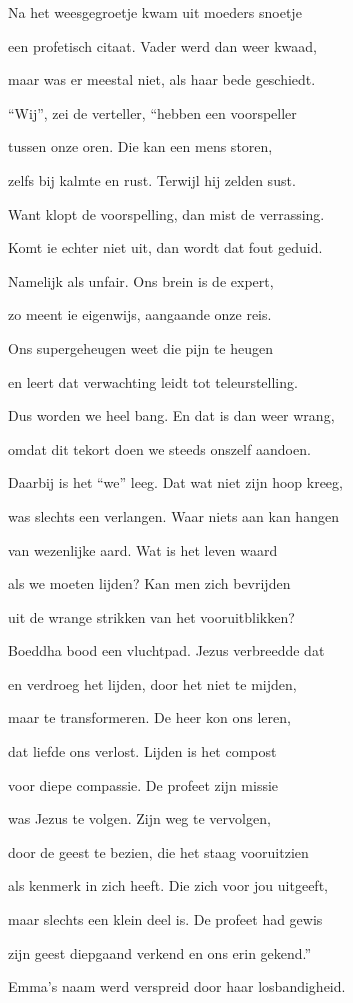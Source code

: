 Na het weesgegroetje
kwam uit moeders snoetje

een profetisch citaat.
Vader werd dan weer kwaad,

maar was er meestal niet,
als haar bede geschiedt.

“Wij”, zei de verteller,
“hebben een voorspeller

tussen onze oren.
Die kan een mens storen,

zelfs bij kalmte en rust.
Terwijl hij zelden sust.

Want klopt de voorspelling,
dan mist de verrassing.

Komt ie echter niet uit,
dan wordt dat fout geduid.

Namelijk als unfair.
Ons brein is de expert,

zo meent ie eigenwijs,
aangaande onze reis.

Ons supergeheugen
weet die pijn te heugen

en leert dat verwachting
leidt tot teleurstelling.

Dus worden we heel bang.
En dat is dan weer wrang,

omdat dit tekort doen
we steeds onszelf aandoen.

Daarbij is het “we” leeg.
Dat wat niet zijn hoop kreeg,

was slechts een verlangen.
Waar niets aan kan hangen

van wezenlijke aard.
Wat is het leven waard

als we moeten lijden?
Kan men zich bevrijden

uit de wrange strikken
van het vooruitblikken?

Boeddha bood een vluchtpad.
Jezus verbreedde dat

en verdroeg het lijden,
door het niet te mijden,

maar te transformeren.
De heer kon ons leren,

dat liefde ons verlost.
Lijden is het compost

voor diepe compassie.
De profeet zijn missie

was Jezus te volgen.
Zijn weg te vervolgen,

door de geest te bezien,
die het staag vooruitzien

als kenmerk in zich heeft.
Die zich voor jou uitgeeft,

maar slechts een klein deel is.
De profeet had gewis

zijn geest diepgaand verkend
en ons erin gekend.”

Emma’s naam werd verspreid
door haar losbandigheid.

